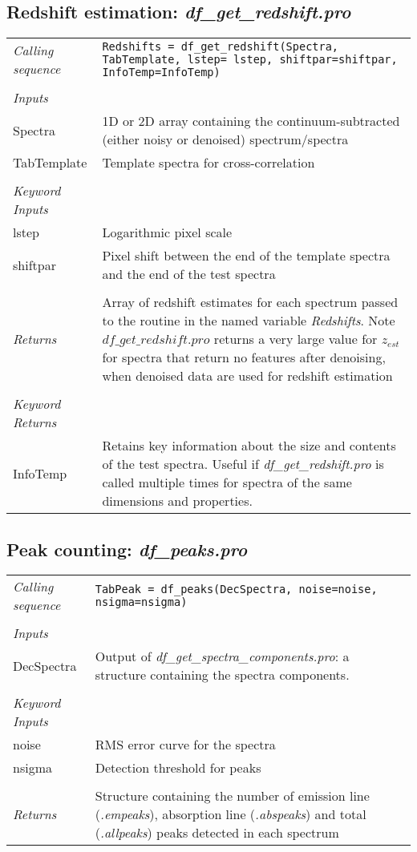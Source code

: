 \documentclass[a4paper]{article}
\begin{document}
\subsection{Redshift estimation: {\em df\_get\_redshift.pro}}

\noindent\begin{tabularx}{\textwidth}{LI}
{\em Calling sequence} & \texttt{Redshifts = df\_get\_redshift(Spectra, TabTemplate,  lstep= lstep, shiftpar=shiftpar, InfoTemp=InfoTemp)}\\
 & \\
{\em Inputs} & \\
Spectra & 1D or 2D array containing the continuum-subtracted (either noisy or denoised) spectrum/spectra \\
TabTemplate & Template spectra for cross-correlation\\
 & \\
{\em Keyword Inputs} & \\
lstep & Logarithmic pixel scale \\
shiftpar & Pixel shift between the end of the template spectra and the end of the test spectra \\
 & \\
{\em Returns} & Array of redshift estimates for each spectrum passed to the routine in the named variable {\em Redshifts}. Note $df\_get\_redshift.pro$ returns a very large value for $z_{est}$ for spectra that return no features after denoising, when denoised data are used for redshift estimation \\
 & \\
{\em Keyword Returns} & \\
InfoTemp & Retains key information about the size and contents of the test spectra. Useful if {\em df\_get\_redshift.pro} is called multiple times for spectra of the same dimensions and properties. 
\end{tabularx}


\subsection{Peak counting: {\em df\_peaks.pro}}

\noindent\begin{tabularx}{\textwidth}{LI}
{\em Calling sequence} & \texttt{TabPeak = df\_peaks(DecSpectra,    noise=noise, nsigma=nsigma)}\\
 & \\
{\em Inputs} & \\
DecSpectra & Output of {\em df\_get\_spectra\_components.pro}: a structure containing the spectra components. \\
 & \\
{\em Keyword Inputs} & \\
noise & RMS error curve for the spectra \\
nsigma & Detection threshold for peaks \\
 & \\
{\em Returns} & Structure containing the number of emission line ({\em .empeaks}), absorption line ({\em .abspeaks}) and total ({\em .allpeaks}) peaks detected in each spectrum
\end{tabularx}
\end{document}

